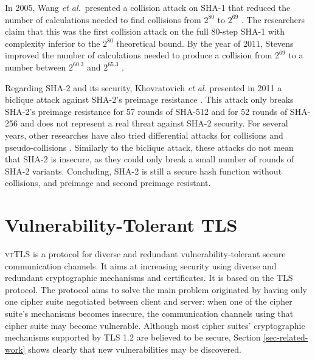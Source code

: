\documentclass{sig-alternate-05-2015}
\begin{document}
In 2005, Wang \emph{et al.}~presented a collision attack on SHA-1 that reduced the number of calculations needed to find collisions from $2^{80}$ to $2^{69}$ \cite{Wang05}. The researchers claim that this was the first collision attack on the full 80-step SHA-1 with complexity inferior to the $2^{80}$ theoretical bound. By the year of 2011, Stevens improved the number of calculations needed to produce a collision from $2^{69}$ to a number between $2^{60.3}$ and $2^{65.3}$ \cite{Stevens11}.

Regarding SHA-2 and its security, Khovratovich \textit{et al.} presented in 2011 a biclique attack against SHA-2's preimage resistance \cite{Khovratovich2011}.
This attack only breaks SHA-2's preimage resistance for 57 rounds of SHA-512 and for 52 rounds of SHA-256 and does not represent a real threat
against SHA-2 security.
For several years, other researches have also tried differential attacks for collisions and pseudo-collisions \cite{Dobraunig2016, Eichlseder2014, Lamberger2011, Mendel2013}.
Similarly to the biclique attack, these attacks do not mean that SHA-2 is insecure, as they could only break a small number of rounds of SHA-2 variants.
Concluding, SHA-2 is still a secure hash function without collisions, and preimage and second preimage resistant.



\section{Vulnerability-Tolerant TLS}
\label{sec-vtTLS}

\textsc{vtTLS} is a protocol for diverse and redundant vulnerabi\-li\-ty-tolerant secure communication channels. It aims at increasing security using diverse and redundant cryptographic mechanisms and certificates. It is based on the TLS protocol. 
The protocol aims to solve the main problem originated by having only one cipher suite negotiated between client and server: when one of the cipher suite's mechanisms becomes insecure, the communication channels using that cipher suite may become vulnerable.
Although most cipher suites' cryptographic mechanisms supported by TLS 1.2 are believed to be secure, Section \ref{sec-related-work} shows clearly that new vulnerabilities may be discovered. 
\end{document}
